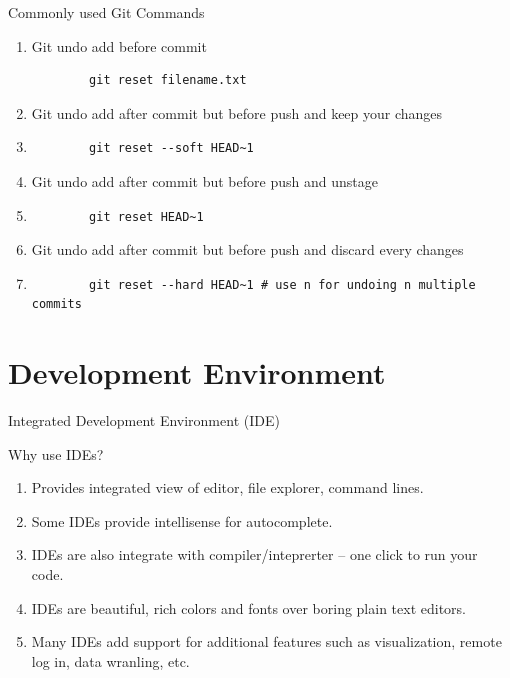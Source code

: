 \documentclass[aspectratio=169,xcolor=dvipsnames,svgnames,x11names,fleqn]{beamer}
\begin{document}
\begin{frame}{Commonly used Git Commands}
\begin{enumerate}
        \item Git undo add before commit
        \begin{verbatim}
        git reset filename.txt
        \end{verbatim}
        \item Git undo add after commit but before push and keep your changes
        \item \begin{verbatim}
        git reset --soft HEAD~1
        \end{verbatim}
        \item Git undo add after commit but before push and unstage
        \item \begin{verbatim}
        git reset HEAD~1
        \end{verbatim}
        \item Git undo add after commit but before push and discard every changes
        \item \begin{verbatim}
        git reset --hard HEAD~1 # use n for undoing n multiple commits
        \end{verbatim}
    \end{enumerate}
    
\end{frame}

\section{Development Environment}

\begin{frame}
    \sectionpage
\end{frame}

\begin{frame}{Integrated Development Environment (IDE)}

    Why use IDEs?
    \begin{enumerate}
        \item Provides integrated view of editor, file explorer, command lines.
        \item Some IDEs provide intellisense for autocomplete.
        \item IDEs are also integrate with compiler/inteprerter -- one click to run your code.
        \item IDEs are beautiful, rich colors and fonts over boring plain text editors.
        \item Many IDEs add support for additional features such as visualization, remote log in, data wranling, etc.
    \end{enumerate}
    
\end{frame}
\end{document}
